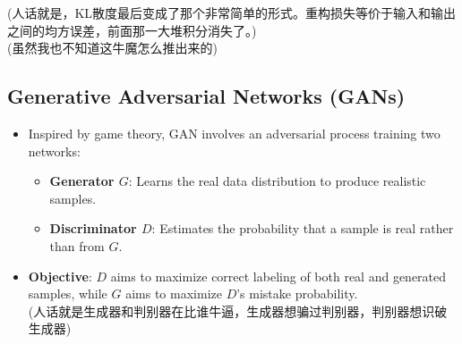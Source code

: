 \documentclass[UTF8]{ctexart}
\begin{document}
\begin{itemize}
    (人话就是，KL散度最后变成了那个非常简单的形式。重构损失等价于输入和输出之间的均方误差，前面那一大堆积分消失了。) \\
    (虽然我也不知道这牛魔怎么推出来的)
\end{itemize}

\subsection{Generative Adversarial Networks (GANs)}
\begin{itemize}
    \item Inspired by game theory, GAN involves an adversarial process training two networks:
    \begin{itemize}
        \item \textbf{Generator $G$}: Learns the real data distribution to produce realistic samples.
        \item \textbf{Discriminator $D$}: Estimates the probability that a sample is real rather than from $G$.
    \end{itemize}
    \item \textbf{Objective}: $D$ aims to maximize correct labeling of both real and generated samples,
    while $G$ aims to maximize $D$'s mistake probability. \\
    (人话就是生成器和判别器在比谁牛逼，生成器想骗过判别器，判别器想识破生成器)


\end{itemize}
\end{document}
